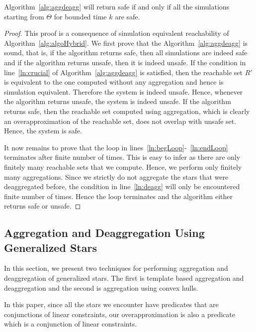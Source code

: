 \begin{lemma}
Algorithm~\ref{alg:aggdeagg} will return safe if and only if all the simulations starting from $\Theta$ for bounded time $k$ are safe.
\end{lemma}
\begin{proof}
This proof is a consequence of simulation equivalent reachability of Algorithm~\ref{alg:algoHybrid}. We first prove that the Algorithm~\ref{alg:aggdeagg} is sound, that is, if the algorithm returns safe, then all simulations are indeed safe and if the algorithm returns unsafe, then it is indeed unsafe. If the condition in line~\ref{ln:crucial} of Algorithm~\ref{alg:aggdeagg} is satisfied, then the reachable set $R'$ is equivalent to the one computed without any aggregation and hence is simulation equivalent. Therefore the system is indeed unsafe. Hence, whenever the algorithm returns unsafe, the system is indeed unsafe. If the algorithm returns safe, then the reachable set computed using aggregation, which is clearly an overapproximation of the reachable set, does not overlap with unsafe set. Hence, the system is safe. 

It now remains to prove that the loop in lines~\ref{ln:begLoop}-~\ref{ln:endLoop} terminates after finite number of times. This is easy to infer as there are only finitely many reachable sets that we compute. Hence, we perform only finitely many aggregations. Since we strictly do not aggregate the stars that were deaggregated before, the condition in line~\ref{ln:deagg} will only be encountered finite number of times. Hence the loop terminates and the algorithm either returns safe or unsafe.
\end{proof}

\subsection{Aggregation and Deaggregation Using Generalized Stars}
\label{sec:aggStars}

In this section, we present two techniques for performing aggregation and deaggregation of generalized stars. The first is template based aggregation and deaggregation and the second is aggregation using convex hulls.
%


In this paper, since all the stars we encounter have predicates that are conjunctions of linear constraints, our overapproximation is also a predicate which is a conjunction of linear constraints.


